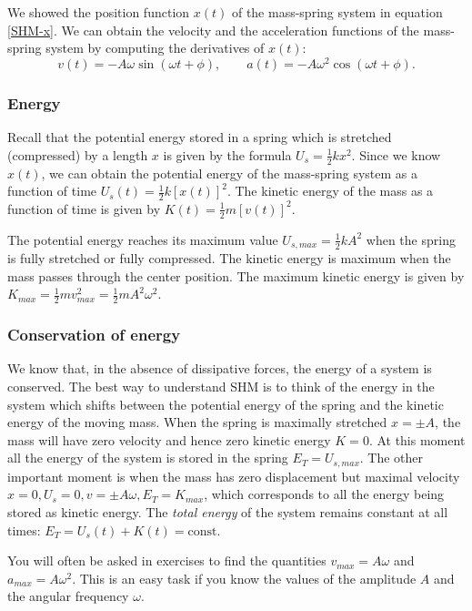 \documentclass[letterpaper,9pt,journal]{IEEEtran}
\newcommand{\be}{\begin{equation}}
\newcommand{\ee}{\end{equation}}
\begin{document}
We showed the position function $x(t)$ of the mass-spring system in equation \eqref{SHM-x}.
We can obtain the velocity and the acceleration functions of the mass-spring system
by computing the derivatives of $x(t)$:
\be
v(t) = -A\omega \sin(\omega t + \phi),  \qquad a(t) = -A\omega^2\cos(\omega t + \phi).
\label{SHM-va}
\ee


\subsubsection{Energy}

Recall that the potential energy stored in a spring which is stretched (compressed) by 
a length $x$ is given by the formula $U_s=\frac{1}{2}k x^2$.
Since we know $x(t)$, we can obtain the potential energy of the mass-spring
system as a function of time $U_s(t)= \frac{1}{2} k[x(t)]^2$.
The kinetic energy of the mass as a function of time is given by
$K(t)= \frac{1}{2} m[v(t)]^2$.

The potential energy reaches its maximum value $U_{s,max}=\frac{1}{2}kA^2$
when the spring is fully stretched or fully compressed.
The kinetic energy is maximum when the mass passes through the center position.
The maximum kinetic energy is given by 
$K_{max} = \frac{1}{2} mv_{max}^2= \frac{1}{2}mA^2\omega^2$.



\subsubsection{Conservation of energy}

We know that, in the absence of dissipative forces, the energy of a system is conserved.
The best way to understand SHM is to think of the energy in the system which
shifts between the potential energy of the spring and the kinetic energy of the moving mass.
When the spring is maximally stretched $x=\pm A$, 
the mass will have zero velocity and hence zero kinetic energy $K=0$. 
At this moment all the energy of the system is stored in the spring  $E_T= U_{s,max}$.
The other important moment is when the mass has zero displacement but maximal velocity 
$x=0, U_s=0, v=\pm A\omega, E_T=K_{max}$,
which corresponds to all the energy being stored as kinetic energy.
The \emph{total energy} of the system remains constant at all times: $E_T = U_s(t) + K(t) = \text{const}$.

You will often be asked in exercises  to find the quantities $v_{max}= A \omega$ and $a_{max} = A \omega^2$.
This is an easy task if you know the values of the amplitude $A$ and 
the angular frequency $\omega$.
\end{document}
